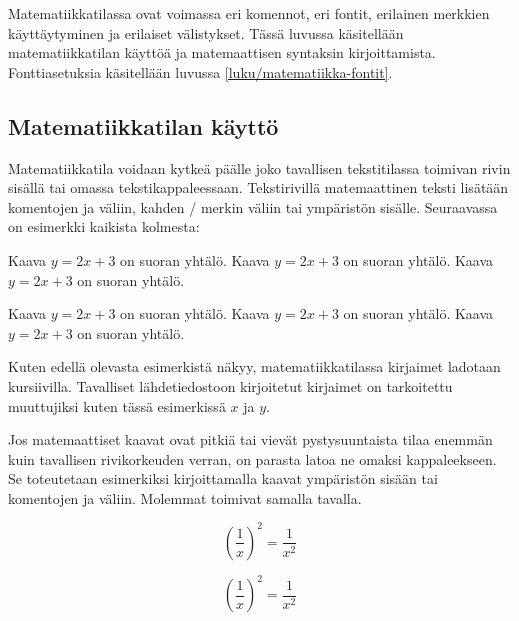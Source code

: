 Matematiikkatilassa ovat voimassa eri komennot, eri fontit, erilainen
merkkien käyttäytyminen ja erilaiset välistykset. Tässä luvussa
käsitellään matematiikkatilan käyttöä ja matemaattisen syntaksin
kirjoittamista. Fonttiasetuksia käsitellään luvussa
\ref{luku/matematiikka-fontit}.

\subsection{Matematiikkatilan käyttö}
\label{luku/matematiikka-käyttö}

Matematiikkatila voidaan kytkeä päälle joko tavallisen tekstitilassa
toimivan rivin sisällä tai omassa tekstikappaleessaan. Tekstirivillä
matemaattinen teksti lisätään komentojen \komento{(} ja \komento{)}
väliin, kahden \koodi{\$}\-/ merkin väliin tai ympäristön
 sisälle. Seuraavassa on esimerkki kaikista kolmesta:

\begin{koodilohkosis}
Kaava \( y = 2x + 3 \) on suoran yhtälö.
Kaava $ y = 2x + 3 $ on suoran yhtälö.
Kaava \begin{math} y = 2x + 3 \end{math} on suoran yhtälö.
\end{koodilohkosis}

\begin{tulossis}
Kaava \( y = 2x + 3 \) on suoran yhtälö.
Kaava $ y = 2x + 3 $ on suoran yhtälö.
Kaava \begin{math} y = 2x + 3 \end{math} on suoran yhtälö.
\end{tulossis}

\noindent
Kuten edellä olevasta esimerkistä näkyy, matematiikkatilassa kirjaimet
ladotaan kursiivilla. Tavalliset lähdetiedostoon kirjoitetut kirjaimet
on tarkoitettu muuttujiksi kuten tässä esimerkissä $x$ ja $y$.

Jos matemaattiset kaavat ovat pitkiä tai vievät pystysuuntaista tilaa
enemmän kuin tavallisen rivikorkeuden verran, on parasta latoa ne omaksi
kappaleekseen. Se toteutetaan esimerkiksi kirjoittamalla kaavat
ympäristön  sisään tai komentojen \komento{[} ja
\komento{]} väliin. Molemmat toimivat samalla tavalla.

\komentoi{[}
\komentoi{]}
\begin{koodilohkosis}
\[ \left(\frac{1}{x}\right)^2 = \frac{1}{x^2} \]
\end{koodilohkosis}
\[ \left(\frac{1}{x}\right)^2 = \frac{1}{x^2} \]

